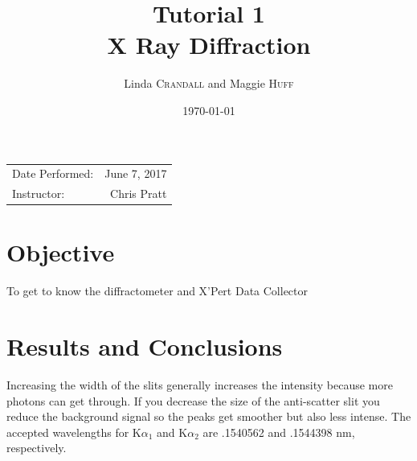 \documentclass{article}
\title{Tutorial 1\\ X Ray Diffraction \\ } %
\author{Linda \textsc{Crandall} and Maggie \textsc{Huff}} %
\date{\today} %
\begin{document}
\maketitle %

\begin{center}
\begin{tabular}{l r}
Date Performed: & June 7, 2017 \\ %
Instructor: & Chris Pratt %
\end{tabular}
\end{center}



\section{Objective}

To get to know the diffractometer and X'Pert Data Collector 




\section{Results and Conclusions}

Increasing the width of the slits generally increases the intensity because more photons can get through. If you decrease the size of the anti-scatter slit you reduce the background signal so the peaks get smoother but also less intense. The accepted wavelengths for K$\alpha_1$ and K$\alpha_2$ are .1540562 and .1544398 nm, respectively. 
\end{document}
